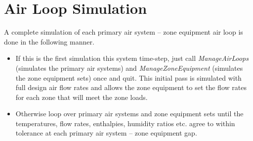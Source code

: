\section{Air Loop Simulation}\label{air-loop-simulation}

A complete simulation of each primary air system -- zone equipment air loop is done in the following manner.

\begin{itemize}
\item
  If this is the first simulation this system time-step, just call \emph{ManageAirLoops} (simulates the primary air systems) and \emph{ManageZoneEquipment} (simulates the zone equipment sets) once and quit. This initial pass is simulated with full design air flow rates and allows the zone equipment to set the flow rates for each zone that will meet the zone loads.
\item
  Otherwise loop over primary air systems and zone equipment sets until the temperatures, flow rates, enthalpies, humidity ratios etc. agree to within tolerance at each primary air system -- zone equipment gap. 
\end{itemize}

